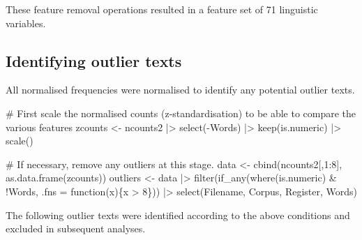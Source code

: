 \documentclass[
  letterpaper,
  DIV=11,
  numbers=noendperiod]{scrreprt}
\newenvironment{Shaded}{\begin{snugshade}}{\end{snugshade}}
\newcommand{\AttributeTok}[1]{\textcolor[rgb]{0.40,0.45,0.13}{#1}}
\newcommand{\CommentTok}[1]{\textcolor[rgb]{0.37,0.37,0.37}{#1}}
\newcommand{\ControlFlowTok}[1]{\textcolor[rgb]{0.00,0.23,0.31}{#1}}
\newcommand{\DecValTok}[1]{\textcolor[rgb]{0.68,0.00,0.00}{#1}}
\newcommand{\FunctionTok}[1]{\textcolor[rgb]{0.28,0.35,0.67}{#1}}
\newcommand{\NormalTok}[1]{\textcolor[rgb]{0.00,0.23,0.31}{#1}}
\newcommand{\OtherTok}[1]{\textcolor[rgb]{0.00,0.23,0.31}{#1}}
\newcommand{\SpecialCharTok}[1]{\textcolor[rgb]{0.37,0.37,0.37}{#1}}
\begin{document}
\begin{Shaded}
\end{Shaded}

These feature removal operations resulted in a feature set of 71
linguistic variables.

\subsection{Identifying outlier texts}\label{identifying-outlier-texts}

All normalised frequencies were normalised to identify any potential
outlier texts.

\begin{Shaded}
\begin{Highlighting}[]
\CommentTok{\# First scale the normalised counts (z{-}standardisation) to be able to compare the various features}
\NormalTok{zcounts }\OtherTok{\textless{}{-}}\NormalTok{ ncounts2 }\SpecialCharTok{|\textgreater{}}
  \FunctionTok{select}\NormalTok{(}\SpecialCharTok{{-}}\NormalTok{Words) }\SpecialCharTok{|\textgreater{}} 
  \FunctionTok{keep}\NormalTok{(is.numeric) }\SpecialCharTok{|\textgreater{}} 
  \FunctionTok{scale}\NormalTok{()}

\CommentTok{\# If necessary, remove any outliers at this stage.}
\NormalTok{data }\OtherTok{\textless{}{-}} \FunctionTok{cbind}\NormalTok{(ncounts2[,}\DecValTok{1}\SpecialCharTok{:}\DecValTok{8}\NormalTok{], }\FunctionTok{as.data.frame}\NormalTok{(zcounts))}
\NormalTok{outliers }\OtherTok{\textless{}{-}}\NormalTok{ data }\SpecialCharTok{|\textgreater{}} 
 \FunctionTok{filter}\NormalTok{(}\FunctionTok{if\_any}\NormalTok{(}\FunctionTok{where}\NormalTok{(is.numeric) }\SpecialCharTok{\&} \SpecialCharTok{!}\NormalTok{Words,  }\AttributeTok{.fns =} \ControlFlowTok{function}\NormalTok{(x)\{x }\SpecialCharTok{\textgreater{}} \DecValTok{8}\NormalTok{\}))  }\SpecialCharTok{|\textgreater{}}
  \FunctionTok{select}\NormalTok{(Filename, Corpus, Register, Words) }
\end{Highlighting}
\end{Shaded}

The following outlier texts were identified according to the above
conditions and excluded in subsequent analyses.
\end{document}
